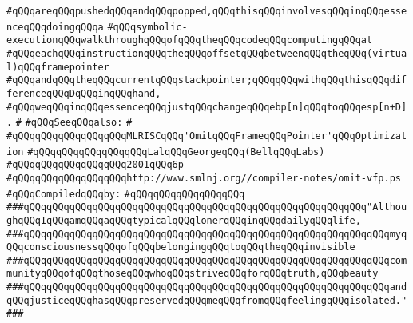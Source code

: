 \verb|#qQQqareqQQqpushedqQQqandqQQqpopped,qQQqthisqQQqinvolvesqQQqinqQQqessenceqQQqdoingqQQqa|\newline
\verb|#qQQqsymbolic-executionqQQqwalkthroughqQQqofqQQqtheqQQqcodeqQQqcomputingqQQqat|\newline
\verb|#qQQqeachqQQqinstructionqQQqtheqQQqoffsetqQQqbetweenqQQqtheqQQq(virtual)qQQqframepointer|\newline
\verb|#qQQqandqQQqtheqQQqcurrentqQQqstackpointer;qQQqqQQqwithqQQqthisqQQqdifferenceqQQqDqQQqinqQQqhand,|\newline
\verb|#qQQqweqQQqinqQQqessenceqQQqjustqQQqchangeqQQqebp[n]qQQqtoqQQqesp[n+D].|\newline
\verb|#|\newline
\verb|#qQQqSeeqQQqalso:|\newline
\verb|#|\newline
\verb|#qQQqqQQqqQQqqQQqqQQqMLRISCqQQq'OmitqQQqFrameqQQqPointer'qQQqOptimization|\newline
\verb|#qQQqqQQqqQQqqQQqqQQqLalqQQqGeorgeqQQq(BellqQQqLabs)|\newline
\verb|#qQQqqQQqqQQqqQQqqQQq2001qQQq6p|\newline
\verb|#qQQqqQQqqQQqqQQqqQQqhttp://www.smlnj.org//compiler-notes/omit-vfp.ps|\newline
\newline
\verb|#qQQqCompiledqQQqby:|\newline
\verb|#qQQqqQQqqQQqqQQqqQQq|\newline
\newline
\newline
\newline
\verb|###qQQqqQQqqQQqqQQqqQQqqQQqqQQqqQQqqQQqqQQqqQQqqQQqqQQqqQQqqQQq"AlthoughqQQqIqQQqamqQQqaqQQqtypicalqQQqlonerqQQqinqQQqdailyqQQqlife,|\newline
\verb|###qQQqqQQqqQQqqQQqqQQqqQQqqQQqqQQqqQQqqQQqqQQqqQQqqQQqqQQqqQQqqQQqmyqQQqconsciousnessqQQqofqQQqbelongingqQQqtoqQQqtheqQQqinvisible|\newline
\verb|###qQQqqQQqqQQqqQQqqQQqqQQqqQQqqQQqqQQqqQQqqQQqqQQqqQQqqQQqqQQqqQQqcommunityqQQqofqQQqthoseqQQqwhoqQQqstriveqQQqforqQQqtruth,qQQqbeauty|\newline
\verb|###qQQqqQQqqQQqqQQqqQQqqQQqqQQqqQQqqQQqqQQqqQQqqQQqqQQqqQQqqQQqqQQqandqQQqjusticeqQQqhasqQQqpreservedqQQqmeqQQqfromqQQqfeelingqQQqisolated."|\newline
\verb|###|\newline
